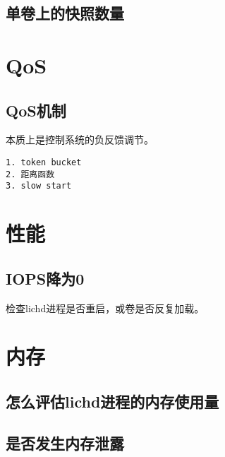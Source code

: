 \subsection{单卷上的快照数量}

\section{QoS}

\subsection{QoS机制}

本质上是控制系统的负反馈调节。

\begin{lstlisting}
1. token bucket
2. 距离函数
3. slow start
\end{lstlisting}

\section{性能}

\subsection{IOPS降为0}

检查lichd进程是否重启，或卷是否反复加载。

\section{内存}

\subsection{怎么评估lichd进程的内存使用量}

\subsection{是否发生内存泄露}
